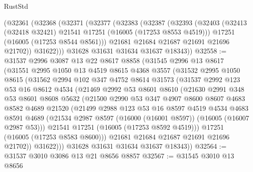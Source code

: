 \begin{lexlean}{RustStd}
\begin{coremodule}
    (@32361
      (@32368
        (@32371
          (@32377
            (@32383
              (@32387
                (@32393
                  (@32403
                    (@32413 (@32418 @32421) @21541 @17251 (@16005 (@17253 @8553 @4519)))
                    @17251
                    (@16005 (@17253 @8544 @8561)))
                  @21681
                  @21684
                  @21687
                  @21691
                  @21696
                  @21702))
              @31622)))
        @31628
        @31631
        @31634
        @31637
        @18343))
@32558 := @31537
    @2996
    @3087
    @13
    @22
    @8617
    @8858
    (@31545
      @2996
      @13
      @8617
      (@31551
        @2995
        @1050
        @13
        @4519
        @8615
        @4368
        @3557
        (@31532
          @2995
          @1050
          @8615
          (@31562
            @2994
            @102
            @347
            @4752
            @8614
            @31573
            (@31537
              @2992
              @123
              @53
              @16
              @8612
              @4534
              (@21469
                @2992
                @53
                @8601
                @8610
                (@21630
                  @2991
                  @348
                  @53
                  @8601
                  @8608
                  @5632
                  (@21500
                    @2990
                    @53
                    @347
                    @4907
                    @8600
                    @8607
                    @4683
                    @8582
                    @4689
                    @21520
                    (@21499
                      @2988
                      @123
                      @53
                      @16
                      @8597
                      @4519
                      @4534
                      @4683
                      @8591
                      @4689
                      (@21534 @2987 @8597 (@16000 (@16001 @8597)) (@16005 (@16007 @2987 @53)))
                      @21541
                      @17251
                      (@16005 (@17253 @8592 @4519)))
                    @17251
                    (@16005 (@17253 @8583 @8600)))
                  @21681
                  @21684
                  @21687
                  @21691
                  @21696
                  @21702))
              @31622)))
        @31628
        @31631
        @31634
        @31637
        @18343))
@32564 := @31537 @3010 @3086 @13 @21 @8656 @8857
@32567 := @31545 @3010 @13 @8656

\end{coremodule}
\end{lexlean}
